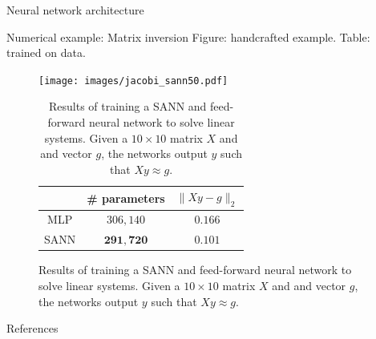 \documentclass[final]{beamer}
\newlength{\sepwidth}
\newlength{\lrcolwidth}
\newcommand{\separatorcolumn}{\begin{column}{\sepwidth}\end{column}}
\begin{document}
\begin{frame}[t]
\begin{columns}[t]
\begin{column}{\lrcolwidth}
\begin{block}{Neural network architecture}
  


    
  \end{block}

  \begin{block}{Numerical example: Matrix inversion}
    Figure: handcrafted example. Table: trained on data.
    \begin{figure}[h]
      \centering
      \begin{minipage}[c]{0.49\textwidth}
          \texttt{[image: images/jacobi\_sann50.pdf]}
      \end{minipage} \hfill
      \begin{minipage}[c]{0.5\textwidth}
          \caption{(left) Trajectories of a SANN that solves linear systems to machine precision. Given a matrix $X \in \mathbb{R}^{50 \times 50}$ and vector $b \in \mathbb{R}^{50}$, the network produces a vector $y \in \mathbb{R}^{50}$ such that $Xy = b$. Each line shows the trajectory of the output $y$ for a given input pair $(X, g)$ as the SANN's ODE is iteratively solved. At each timestep, the network performs a single Jacobi iteration update. The output of the network exactly matches the output of $100$ steps of Jacobi iteration.}
          \label{fig:jacobi_sann}
          \begin{table}[h]
            \centering
            \begin{tabular}{c|c|c}
              & \# parameters & $\| Xy - g \|_2$ \\ \hline
              MLP & $306,140$ & $0.166$ \\ \hline
              SANN & $\mathbf{291,720}$ & $\mathbf{0.101}$
            \end{tabular}
            \caption{Results of training a SANN and feed-forward neural network to solve linear systems. Given a $10 \times 10$ matrix $X$ and and vector $g$, the networks output $y$ such that $Xy \approx g$.}
          \end{table}
      \end{minipage}
    \end{figure}

  \end{block}

  \begin{block}{References}

    \nocite{*}
    \footnotesize{}

  \end{block}

\end{column}

\separatorcolumn
\end{columns}
\end{frame}
\end{document}
